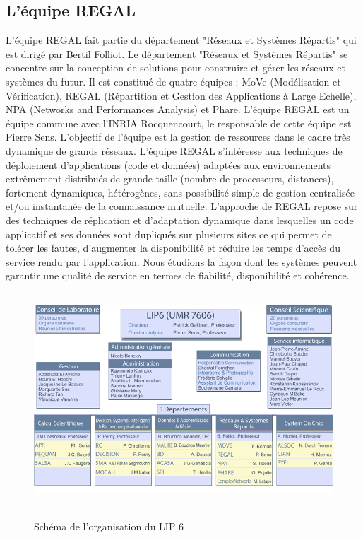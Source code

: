 	\subsection{L'équipe REGAL}
	L'équipe REGAL fait partie du département "Réseaux et Systèmes Répartis" qui est dirigé par Bertil Folliot. Le département "Réseaux et Systèmes Répartis" se concentre sur la conception de solutions pour construire et gérer les réseaux et systèmes du futur. Il est constitué de quatre équipes : MoVe (Modélisation et Vérification), REGAL (Répartition et Gestion des Applications à Large Echelle), NPA (Networks and Performances Analysis) et Phare. L'équipe REGAL est un équipe commune avec l'INRIA Rocquencourt, le responsable de cette équipe est Pierre Sens. L'objectif de l'équipe est la gestion de ressources dans le cadre très dynamique de grands réseaux. L'équipe REGAL s'intéresse aux techniques de déploiement d'applications (code et données) adaptées aux environnements extrêmement distribués de grande taille (nombre de processeurs, distances), fortement dynamiques, hétérogènes, sans possibilité simple de gestion centralisée et/ou instantanée de la connaissance mutuelle. L'approche de REGAL repose sur des techniques de réplication et d'adaptation dynamique dans lesquelles un code applicatif et ses données sont dupliqués sur plusieurs sites ce qui permet de tolérer les fautes, d'augmenter la disponibilité et réduire les temps d'accès du service rendu par l'application. Nous étudions la façon dont les systèmes peuvent garantir une qualité de service en termes de fiabilité, disponibilité et cohérence.

	\vspace{1.5cm}
        \begin{figure}[!h]
        \centering
        \includegraphics[width=15cm,height=8cm]{../Images/Lip6_Organisation.png}\\
        \caption{Schéma de l'organisation du LIP 6}
        \label{LIP 6}
        \end{figure}
	\vspace{1.5cm}

